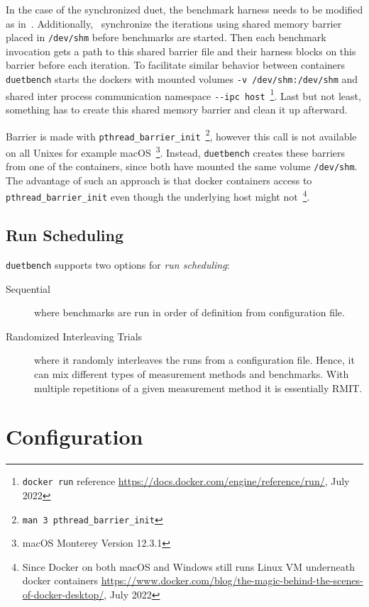In the case of the synchronized duet, the benchmark harness needs to be modified as in~\citet{bulej2020duet}.
Additionally,~\citet{bulej2020duet} synchronize the iterations using shared memory barrier placed in \lstinline{/dev/shm} before benchmarks are started.
Then each benchmark invocation gets a path to this shared barrier file and their harness blocks on this barrier before each iteration.
To facilitate similar behavior between containers \lstinline{duetbench} starts the dockers with mounted volumes \lstinline{-v /dev/shm:/dev/shm} and shared inter process communication namespace \lstinline{--ipc host}~\footnote{\lstinline{docker run} reference \url{https://docs.docker.com/engine/reference/run/}, July 2022}.
Last but not least, something has to create this shared memory barrier and clean it up afterward.

Barrier is made with \lstinline{pthread_barrier_init}~\footnote{\lstinline{man 3 pthread_barrier_init}}, however this call is not available on all Unixes for example macOS~\footnote{macOS Monterey Version 12.3.1}.
Instead, \lstinline{duetbench} creates these barriers from one of the containers, since both have mounted the same volume \lstinline{/dev/shm}.
The advantage of such an approach is that docker containers access to \lstinline{pthread_barrier_init} even though the underlying host might not~\footnote{Since Docker on both macOS and Windows still runs Linux VM underneath docker containers \url{https://www.docker.com/blog/the-magic-behind-the-scenes-of-docker-desktop/}, July 2022}.

\subsection{Run Scheduling}
\label{sec:scheduling}

\lstinline{duetbench} supports two options for \emph{run scheduling}:
\begin{description}
    \item[Sequential] where benchmarks are run in order of definition from configuration file.
    \item[Randomized Interleaving Trials] where it randomly interleaves the runs from a configuration file.
        Hence, it can mix different types of measurement methods and benchmarks.
        With multiple repetitions of a given measurement method it is essentially RMIT\cite{abedi2017conducting}.
\end{description}

\section{Configuration}
\label{sec:configuration}

